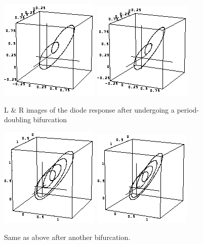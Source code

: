 \documentclass{../lab}
\begin{document}
\begin{figure}
    \centering
    \href{http://experimentationlab.berkeley.edu/sites/default/files/images/Nldimage044.gif}{\includegraphics[width=0.33\linewidth,keepaspectratio]{images/Nldimage044.png}}
    \href{http://experimentationlab.berkeley.edu/sites/default/files/images/Nldimage045.gif}{\includegraphics[width=0.33\linewidth,keepaspectratio]{images/Nldimage045.png}}
    \caption{L \& R images of the diode response after undergoing a period-doubling bifurcation}
\end{figure}

\begin{figure}
    \centering
    \href{http://experimentationlab.berkeley.edu/sites/default/files/images/Nldimage046.gif}{\includegraphics[width=0.33\linewidth,keepaspectratio]{images/Nldimage046.png}}
    \href{http://experimentationlab.berkeley.edu/sites/default/files/images/Nldimage047.gif}{\includegraphics[width=0.33\linewidth,keepaspectratio]{images/Nldimage047.png}}
    \caption{Same as above after another bifurcation.}
\end{figure}
\end{document}
